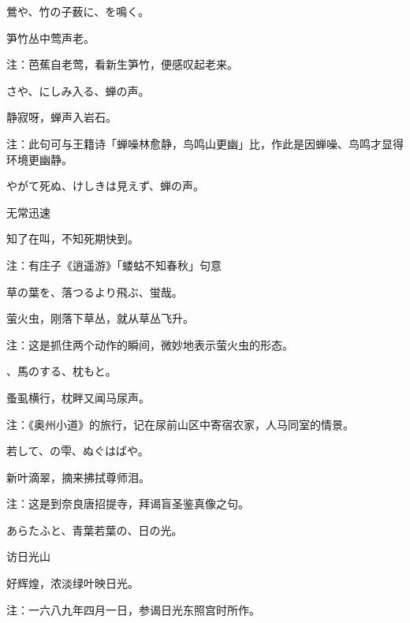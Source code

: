 \begin{haiku}
    {\FH 鶯や、竹の子薮に、を鳴く。}

    {\FK 笋竹丛中莺声老。}

    {\FT 注：芭蕉自老莺，看新生笋竹，便感叹起老来。}
\end{haiku}

\begin{haiku}
    {\FH {}さや、にしみ入る、蝉の声。}

    {\FK 静寂呀，蝉声入岩石。}

    {\FT 注：此句可与王籍诗「蝉噪林愈静，鸟鸣山更幽」比，作此是因蝉噪、鸟鸣才显得环境更幽静。}
\end{haiku}

\begin{haiku}
    {\FH やがて死ぬ、けしきは見えず、蝉の声。}

    {\FK 无常迅速}

    {\FK 知了在叫，不知死期快到。}

    {\FT 注：有庄子《逍遥游》「蝼蛄不知春秋」句意}
\end{haiku}

\begin{haiku}
    {\FH 草の葉を、落つるより飛ぶ、蛍哉。}

    {\FK 萤火虫，刚落下草丛，就从草丛飞升。}

    {\FT 注：这是抓住两个动作的瞬间，微妙地表示萤火虫的形态。}
\end{haiku}

\begin{haiku}
    {\FH {}、馬のする、枕もと。}

    {\FK 蚤虱横行，枕畔又闻马尿声。}

    {\FT 注：《奥州小道》的旅行，记在尿前山区中寄宿农家，人马同室的情景。}
\end{haiku}

\begin{haiku}
    {\FH 若して、の雫、ぬぐはばや。}

    {\FK 新叶滴翠，摘来拂拭尊师泪。}

    {\FT 注：这是到奈良唐招提寺，拜谒盲圣鉴真像之句。}
\end{haiku}

\begin{haiku}
    {\FH あらたふと、青葉若葉の、日の光。}

    {\FK 访日光山}

    {\FK 好辉煌，浓淡绿叶映日光。}

    {\FT 注：一六八九年四月一日，参谒日光东照宫时所作。}
\end{haiku}

